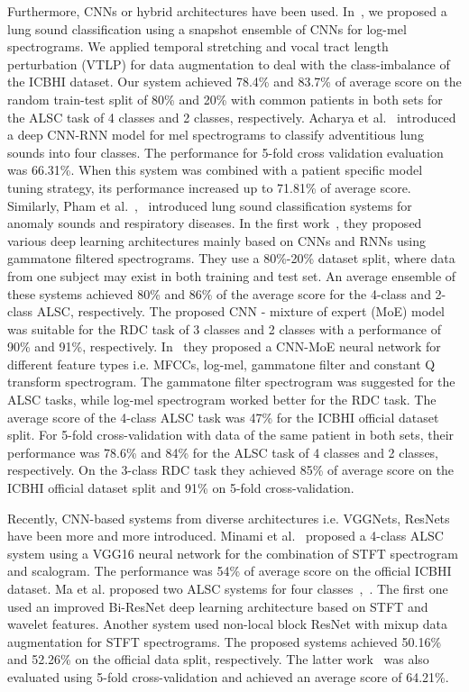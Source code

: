 \documentclass[journal]{IEEEtran}
\begin{document}
Furthermore, CNNs or hybrid architectures have been used.
In~\cite{nguyen2020lung}, we proposed a lung sound classification using a snapshot ensemble of CNNs for log-mel spectrograms. We applied temporal stretching and vocal tract length perturbation (VTLP) for data augmentation to deal with the class-imbalance of the ICBHI dataset. Our system achieved 78.4\% and 83.7\% of average score on the random train-test split of 80\% and 20\% with common patients in both sets for the ALSC task of 4 classes and 2 classes, respectively.
Acharya et al.~\cite{acharya2020deep} introduced a deep CNN-RNN model for mel spectrograms to classify adventitious lung sounds into four classes. The performance for 5-fold cross validation evaluation was 66.31\%. When this system was combined with a patient specific model tuning strategy, its performance increased up to 71.81\% of average score. 
Similarly, Pham et al.~\cite{pham2020robust},~\cite{pham2021cnn} introduced lung sound classification systems for anomaly sounds and respiratory diseases. In the first work~\cite{pham2020robust}, they proposed various deep learning architectures mainly based on CNNs and RNNs using gammatone filtered spectrograms. They use a 80\%-20\% dataset split, where data from one subject may exist in both training and test set. An average ensemble of these systems achieved 80\% and 86\% of the average score for the 4-class and 2-class ALSC, respectively. The proposed CNN - mixture of expert (MoE) model was suitable for the RDC task of 3 classes and 2 classes with a performance of 90\% and 91\%, respectively.
In~\cite{pham2021cnn} they proposed a CNN-MoE neural network for different feature types i.e. MFCCs, log-mel, gammatone filter and constant Q transform spectrogram. The gammatone filter spectrogram was suggested for the ALSC tasks, while log-mel spectrogram worked better for the RDC task. The average score of the 4-class ALSC task was 47\% for the ICBHI official dataset split. For 5-fold cross-validation with data of the same patient in both sets, their performance was 78.6\% and 84\% for the ALSC task of 4 classes and 2 classes, respectively. On the 3-class RDC task they achieved 85\% of average score on the ICBHI official dataset split and 91\% on 5-fold cross-validation.

Recently, CNN-based systems from diverse architectures i.e. VGGNets, ResNets have been more and more introduced.
Minami et al.~\cite{minami2019automatic} proposed a 4-class ALSC system using a VGG16 neural network for the combination of STFT spectrogram and scalogram. The performance was 54\% of average score on the official ICBHI dataset. 
Ma et al. proposed two ALSC systems for four classes~\cite{ma2019lungbrn},~\cite{ma2020lungrn+}. The first one used an improved Bi-ResNet deep learning architecture based on STFT and wavelet features. Another system used non-local block ResNet with mixup data augmentation for STFT spectrograms. The proposed systems achieved 50.16\% and 52.26\% on the official data split, respectively. The latter work~\cite{ma2020lungrn+} was also evaluated using 5-fold cross-validation and achieved an average score of 64.21\%.
\end{document}
